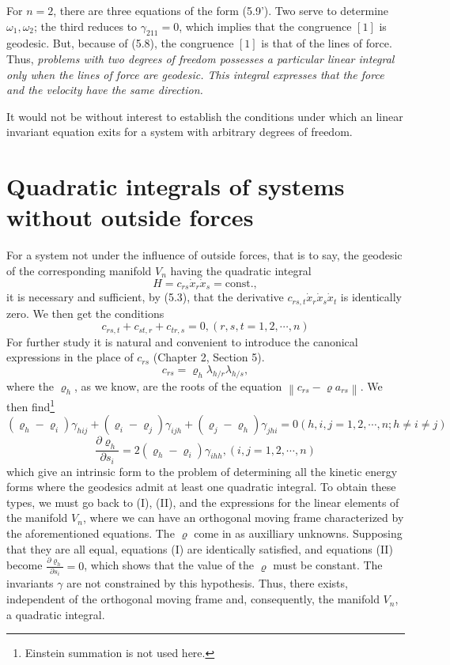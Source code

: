\documentclass{book}
\begin{document}
For $n=2$, there are three equations of the form (5.9'). Two serve to determine $\omega_1,\omega_2$; the third reduces to $\gamma_{211}=0$, which implies that the congruence $[1]$ is geodesic. But, because of (5.8), the congruence $[1]$ is that of the lines of force. Thus, \emph{problems with two degrees of freedom possesses a particular linear integral only when the lines of force are geodesic. This integral expresses that the force and the velocity have the same direction.}

It would not be without interest to establish the conditions under which an linear invariant equation exits for a system with arbitrary degrees of freedom. 

\section{Quadratic integrals of systems without outside forces}
For a system not under the influence of outside forces, that is to say, the geodesic of the corresponding manifold $V_n$ having the quadratic integral
$$H=c_{rs}\dot{x}_r\dot{x}_s=\text{const.},$$
it is necessary and sufficient, by (5.3), that the derivative $c_{rs,t}\dot{x}_r\dot{x}_s\dot{x}_t$ is identically zero. We then get the conditions
\begin{equation}
c_{rs,t}+c_{st,r}+c_{tr,s}=0, (r,s,t=1,2,\cdots,n)
\end{equation}
For further study it is natural and convenient to introduce the canonical expressions in the place of $c_{rs}$ (Chapter 2, Section 5). 
\begin{equation}
c_{rs}=\varrho_h\lambda_{h/r}\lambda_{h/s},
\end{equation}
where the $\varrho_h$, as we know, are the roots of the equation $\left\|c_{rs}-\varrho a_{rs}\right\|$. We then find\footnote{Einstein summation is not used here.}
\begin{equation*}
(\varrho_h-\varrho_i)\gamma_{hij}+(\varrho_i-\varrho_j)\gamma_{ijh}+(\varrho_j-\varrho_h)\gamma_{jhi}=0 (h,i,j=1,2,\cdots,n; h\neq i\neq j)
\tag{I}
\end{equation*}
\begin{equation}
\frac{\partial\varrho_h}{\partial s_i}=2(\varrho_h-\varrho_i)\gamma_{ihh}, (i,j=1,2,\cdots,n)
\tag{II}
\end{equation}
which give an intrinsic form to the problem of determining all the kinetic energy forms where the geodesics admit at least one quadratic integral. To obtain these types, we must go back to (I), (II), and the expressions for the linear elements of the manifold $V_n$, where we can have an orthogonal moving frame characterized by the aforementioned equations. The $\varrho$ come in as auxilliary unknowns. Supposing that they are all equal, equations (I) are identically satisfied, and equations (II) become $\frac{\partial\varrho_h}{\partial s_i}=0$, which shows that the value of the $\varrho$ must be constant. The invariants $\gamma$ are not constrained by this hypothesis. Thus, there exists, independent of the orthogonal moving frame and, consequently, the manifold $V_n$, a quadratic integral.
\end{document}
